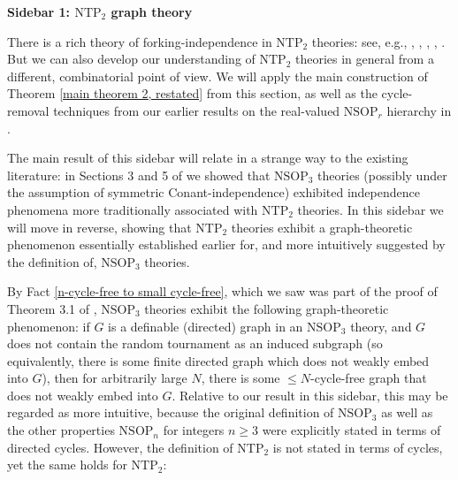 \documentclass{amsart}
\theoremstyle{definition}
\theoremstyle{remark}
\numberwithin{equation}{section}
\begin{document}
\begin{tcolorbox}[
    enhanced,
    breakable,
    oversize,                 %
    colback=blue!5!white,     %
    colframe=blue!75!black,   %
    skin first=enhanced,      %
    skin middle=enhanced,     %
    skin last=enhanced        %
]

\textsf{\textbf{Sidebar 1: $\mathrm{NTP}_{2}$ graph theory}}

\:

\: There is a rich theory of forking-independence in $\mathrm{NTP}_{2}$ theories: see, e.g., \cite{CK12}, \cite{BYC14}, \cite{Che14}, \cite{KS17}, \cite{Sim20}. But we can also develop our understanding of $\mathrm{NTP}_{2}$ theories in general from a different, combinatorial point of view. We will apply the main construction of Theorem \ref{main theorem 2, restated} from this section, as well as the cycle-removal techniques from our earlier results on the real-valued $\mathrm{NSOP}_{r}$ hierarchy in \cite{ApproxOrder}.

\: The main result of this sidebar will relate in a strange way to the existing literature: in Sections 3 and 5 of \cite{INDNSOP3} we showed that $\mathrm{NSOP}_{3}$ theories (possibly under the assumption of symmetric Conant-independence) exhibited independence phenomena more traditionally associated with $\mathrm{NTP}_{2}$ theories. In this sidebar we will move in reverse, showing that $\mathrm{NTP}_{2}$ theories exhibit a graph-theoretic phenomenon essentially established earlier for, and more intuitively suggested by the definition of, $\mathrm{NSOP}_{3}$ theories.

\: By Fact \ref{n-cycle-free to small cycle-free}, which we saw was part of the proof of Theorem 3.1 of \cite{ApproxOrder}, $\mathrm{NSOP}_{3}$ theories exhibit the following graph-theoretic phenomenon: if $G$ is a definable (directed) graph in an $\mathrm{NSOP}_{3}$ theory, and $G$ does not contain the random tournament as an induced subgraph (so equivalently, there is some finite directed graph which does not weakly embed into $G$), then for arbitrarily large $N$, there is some $\leq N$-cycle-free graph that does not weakly embed into $G$. Relative to our result in this sidebar, this may be regarded as more intuitive, because the original definition of $\mathrm{NSOP}_{3}$ as well as the other properties $\mathrm{NSOP}_{n}$ for integers $n \geq 3$  were explicitly stated in terms of directed cycles. However, the definition of $\mathrm{NTP}_{2}$ is not stated in terms of cycles, yet the same holds for $\mathrm{NTP}_{2}$:


\end{tcolorbox}
\end{document}
